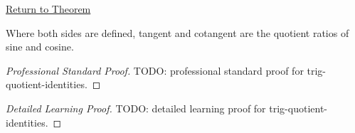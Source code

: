\newpage
{}
\label{prf:trig-quotient-identities}

\begin{remark*}[Return]
\hyperref[thm:trig-quotient-identities]{Return to Theorem}
\end{remark*}

\begin{theorem*}
Where both sides are defined, tangent and cotangent are the quotient ratios of
sine and cosine.
\end{theorem*}

\begin{proof}[Professional Standard Proof]
\LRAProofBodyStart
TODO: professional standard proof for trig-quotient-identities.
\end{proof}

\begin{proof}[Detailed Learning Proof]
\LRAProofBodyStart
TODO: detailed learning proof for trig-quotient-identities.
\end{proof}

\clearpage
